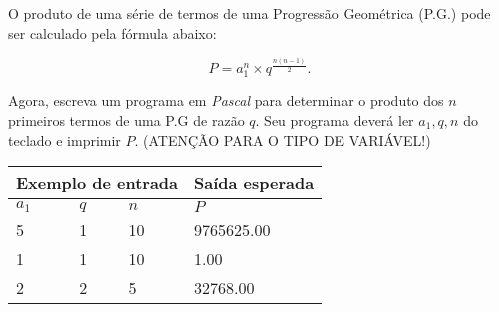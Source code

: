 \item O produto de uma série de termos de uma Progressão Geométrica (P.G.)
pode ser calculado pela fórmula abaixo:

\[
P = a_1^n \times q^{\frac{n(n-1)}{2}}.
\]

Agora, escreva um programa em \emph{Pascal} para determinar o produto dos
$n$ primeiros termos de uma P.G de razão $q$. Seu programa deverá ler
$a_1, q, n$ do teclado e imprimir $P$.
(ATENÇÃO PARA O TIPO DE VARIÁVEL!)

\begin{center}
\begin{tabular}{|l|l|l|l|} \hline
\multicolumn{3}{|c|}{Exemplo de entrada} & Saída esperada \\ \hline
$a_1$ & $q$ & $n$   & $P$               \\ \hline
5 & 1 & 10         & 9765625.00                \\ \hline
1 & 1 & 10          & 1.00             \\ \hline
2 & 2 & 5         & 32768.00          \\ \hline
\end{tabular}
\end{center}
